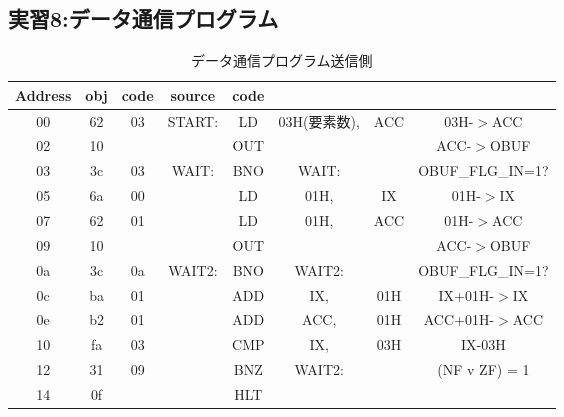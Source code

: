 \documentclass[dvipdfmx]{jsarticle}
\begin{document}
\newpage
      \subsection{実習8:データ通信プログラム}

      \begin{table}[h]
        \centering
        \caption{データ通信プログラム送信側}
        \label{tab:out}
        \begin{tabular}{c|cc|cc|ccc}
          \hline \hline

          Address & obj & code & source  & code &  &  &  \\ \hline
          00 & 62 & 03 & START: & LD & 03H(要素数), & ACC & 03H-$>$ACC \\
          02 & 10 &  &  & OUT &  &  & ACC-$>$OBUF \\
          03 & 3c & 03 & WAIT: & BNO & WAIT: &  & OBUF\_FLG\_IN=1? \\
          05 & 6a & 00 &  & LD & 01H, & IX & 01H-$>$IX \\
          07 & 62 & 01 &  & LD & 01H, & ACC & 01H-$>$ACC \\
          09 & 10 &  &  & OUT &  &  & ACC-$>$OBUF \\
          0a & 3c & 0a & WAIT2: & BNO & WAIT2: &  & OBUF\_FLG\_IN=1? \\
          0c & ba & 01 &  & ADD & IX, & 01H & IX+01H-$>$IX \\
          0e & b2 & 01 &  & ADD & ACC, & 01H & ACC+01H-$>$ACC \\
          10 & fa & 03 &  & CMP & IX, & 03H & IX-03H \\
          12 & 31 & 09 &  & BNZ & WAIT2: &  & (NF v ZF) = 1 \\
          14 & 0f &  &  & HLT &  &  &  \\ \hline

        \end{tabular}
      \end{table}
\end{document}
